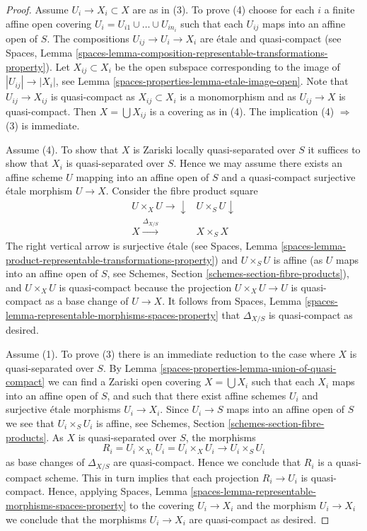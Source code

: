 \begin{proof}
Assume  $U_i \to X_i \subset X$ are as in (3). To prove (4)
choose for each $i$ a finite affine open covering $U_i =
U_{i1} \cup \ldots \cup U_{in_i}$ such that each $U_{ij}$ maps
into an affine open of $S$. The compositions
$U_{ij} \to U_i \to X_i$ are \'etale and quasi-compact (see
Spaces, Lemma
\ref{spaces-lemma-composition-representable-transformations-property}).
Let $X_{ij} \subset X_i$ be the open subspace corresponding to
the image of $|U_{ij}| \to |X_i|$, see
Lemma \ref{spaces-properties-lemma-etale-image-open}.
Note that $U_{ij} \to X_{ij}$ is quasi-compact as $X_{ij} \subset X_i$
is a monomorphism and as $U_{ij} \to X$ is quasi-compact.
Then $X = \bigcup X_{ij}$ is a covering as in (4).
The implication (4) $\Rightarrow$ (3) is immediate.

\medskip\noindent
Assume (4). To show that $X$ is Zariski locally quasi-separated over $S$
it suffices to show that $X_i$ is quasi-separated over $S$.
Hence we may assume there exists an affine scheme $U$ mapping into
an affine open of $S$ and a quasi-compact surjective \'etale
morphism $U \to X$. Consider the fibre product square
$$
\begin{array}{cc}U \times_X U \longrightarrow\downarrow & U \times_S U \downarrow \\ X \overset{\Delta_{X/S}}{\longrightarrow} & X \times_S X\end{array}
$$
The right vertical arrow is surjective \'etale (see
Spaces, Lemma
\ref{spaces-lemma-product-representable-transformations-property})
and $U \times_S U$ is affine (as $U$ maps into an affine open of $S$, see
Schemes, Section \ref{schemes-section-fibre-products}),
and $U \times_X U$ is quasi-compact
because the projection $U \times_X U \to U$ is quasi-compact as a
base change of $U \to X$. It follows from
Spaces, Lemma \ref{spaces-lemma-representable-morphisms-spaces-property}
that $\Delta_{X/S}$ is quasi-compact as desired.

\medskip\noindent
Assume (1). To prove (3) there is an immediate reduction to the case
where $X$ is quasi-separated over $S$. By
Lemma \ref{spaces-properties-lemma-union-of-quasi-compact}
we can find a Zariski open covering $X = \bigcup X_i$ such that each
$X_i$ maps into an affine open of $S$, and such that there exist affine
schemes $U_i$ and surjective \'etale morphisms $U_i \to X_i$.
Since $U_i \to S$ maps into an affine open of $S$ we see that
$U_i \times_S U_i$ is affine, see
Schemes, Section \ref{schemes-section-fibre-products}.
As $X$ is quasi-separated over $S$, the morphisms
$$
R_i = U_i \times_{X_i} U_i = U_i \times_X U_i
\longrightarrow
U_i \times_S U_i
$$
as base changes of $\Delta_{X/S}$ are quasi-compact. Hence we conclude
that $R_i$ is a quasi-compact scheme. This in turn implies that each
projection $R_i \to U_i$ is quasi-compact. Hence, applying
Spaces, Lemma \ref{spaces-lemma-representable-morphisms-spaces-property}
to the covering $U_i \to X_i$ and the morphism $U_i \to X_i$
we conclude that the morphisms $U_i \to X_i$ are quasi-compact as desired.


\end{proof}
